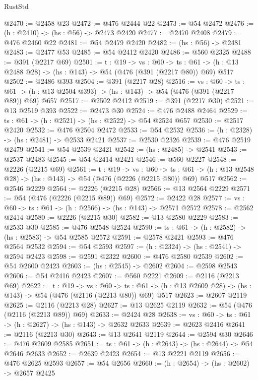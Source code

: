 \begin{lexlean}{RustStd}
\begin{coremodule}
{\begin{coremodule}
{{{{{{{{{{{{{{{{{{{{{{{{{{{{{{{{{{{{{{@2470 := @2458 @23
@2472 := @476 @2444 @22
@2473 := @54 @2472
@2476 := (h : @2410) -> (hs : @56) -> @2473 @2420
@2477 := @2470 @2408
@2479 := @476 @2460 @22
@2481 := @54 @2479 @2420
@2482 := (hs : @56) -> @2481
@2483 := @2477 @53
@2485 := @54 @2412 @2420
@2486 := @560 @2325
@2488 := @391 (@2217 @69)
@2501 := {t : @19} ->
  {vs : @60} ->
  {ts : @61} -> (h : @13 @2488 @28) -> (hs : @143) -> @54 (@476 (@391 (@2217 @80)) @69) @517
@2502 := @2486 @393
@2504 := @391 (@2217 @28)
@2516 := {vs : @60} ->
  {ts : @61} -> (h : @13 @2504 @393) -> (hs : @143) -> @54 (@476 (@391 (@2217 @89)) @69) @657
@2517 := @2502 @2412
@2519 := @391 (@2217 @30)
@2521 := @13 @2519 @393
@2522 := @2473 @30
@2524 := @476 @2488 @2464
@2529 := {ts : @61} -> (h : @2521) -> (hs : @2522) -> @54 @2524 @657
@2530 := @2517 @2420
@2532 := @476 @2504 @2472
@2533 := @54 @2532
@2536 := (h : @2328) -> (hs : @2481) -> @2533 @2421
@2537 := @2530 @2326
@2539 := @476 @2519 @2479
@2541 := @54 @2539 @2421
@2542 := (hs : @2485) -> @2541
@2543 := @2537 @2483
@2545 := @54 @2414 @2421
@2546 := @560 @2227
@2548 := @2226 (@2215 @69)
@2561 := {t : @19} ->
  {vs : @60} ->
  {ts : @61} -> (h : @13 @2548 @28) -> (hs : @143) -> @54 (@476 (@2226 (@2215 @80)) @69) @517
@2562 := @2546 @2229
@2564 := @2226 (@2215 @28)
@2566 := @13 @2564 @2229
@2571 := @54 (@476 (@2226 (@2215 @89)) @69)
@2572 := @2422 @28
@2577 := {vs : @60} -> {ts : @61} -> (h : @2566) -> (hs : @143) -> @2571 @2572
@2578 := @2562 @2414
@2580 := @2226 (@2215 @30)
@2582 := @13 @2580 @2229
@2583 := @2533 @30
@2585 := @476 @2548 @2524
@2590 := {ts : @61} -> (h : @2582) -> (hs : @2583) -> @54 @2585 @2572
@2591 := @2578 @2421
@2593 := @476 @2564 @2532
@2594 := @54 @2593
@2597 := (h : @2324) -> (hs : @2541) -> @2594 @2423
@2598 := @2591 @2322
@2600 := @476 @2580 @2539
@2602 := @54 @2600 @2423
@2603 := (hs : @2545) -> @2602
@2604 := @2598 @2543
@2606 := @54 @2416 @2423
@2607 := @560 @2221
@2609 := @2116 (@2213 @69)
@2622 := {t : @19} ->
  {vs : @60} ->
  {ts : @61} -> (h : @13 @2609 @28) -> (hs : @143) -> @54 (@476 (@2116 (@2213 @80)) @69) @517
@2623 := @2607 @2119
@2625 := @2116 (@2213 @28)
@2627 := @13 @2625 @2119
@2632 := @54 (@476 (@2116 (@2213 @89)) @69)
@2633 := @2424 @28
@2638 := {vs : @60} -> {ts : @61} -> (h : @2627) -> (hs : @143) -> @2632 @2633
@2639 := @2623 @2416
@2641 := @2116 (@2213 @30)
@2643 := @13 @2641 @2119
@2644 := @2594 @30
@2646 := @476 @2609 @2585
@2651 := {ts : @61} -> (h : @2643) -> (hs : @2644) -> @54 @2646 @2633
@2652 := @2639 @2423
@2654 := @13 @2221 @2119
@2656 := @476 @2625 @2593
@2657 := @54 @2656
@2660 := (h : @2654) -> (hs : @2602) -> @2657 @2425
}}}}}}}}}}}}}}}}}}}}}}}}}}}}}}}}}}}}}}
\end{coremodule}}
\end{coremodule}
\end{lexlean}
